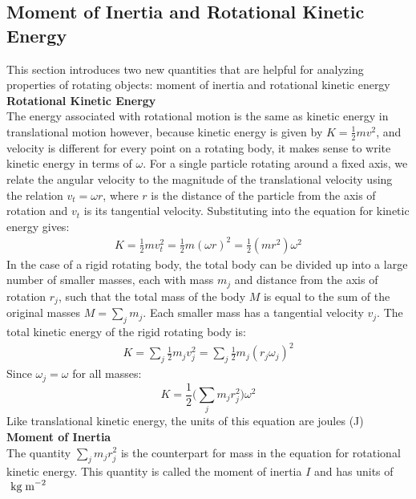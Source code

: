 \documentclass[a4paper]{article}
\let\bf\textbf
\newcommand\kgmm{\text{ kg\;m}^{-2}}
\begin{document}
\subsection{Moment of Inertia and Rotational Kinetic Energy}
This section introduces two new quantities that are helpful for analyzing properties of rotating objects: moment of inertia and rotational kinetic energy
\vspace{2mm}\\
\bf{Rotational Kinetic Energy}
\vspace{2mm}\\
The energy associated with rotational motion is the same as kinetic energy in translational motion however, because kinetic energy is given by $K = \frac{1}{2}mv^2$, and velocity is different for every point on a rotating body, it makes sense to write kinetic energy in terms of $\omega$. For a single particle rotating around a fixed axis, we relate the angular velocity to the magnitude of the translational velocity using the relation $v_t = \omega r$, where $r$ is the distance of the particle from the axis of rotation and $v_t$ is its tangential velocity. Substituting into the equation for kinetic energy gives:
\begin{align*}
    K = \frac{1}{2}mv_t^2 = \frac{1}{2}m(\omega r)^2 = \frac{1}{2}(mr^2)\omega^2
\end{align*}
In the case of a rigid rotating body, the total body can be divided up into a large number of smaller masses, each with mass $m_j$ and distance from the axis of rotation $r_j$, such that the total mass of the body $M$ is equal to the sum of the original masses $M = \sum_{j}m_j$. Each smaller mass has a tangential velocity $v_j$. The total kinetic energy of the rigid rotating body is:
\begin{align*}
    K = \sum_{j}\frac{1}{2}m_jv^2_j = \sum_{j}\frac{1}{2}m_j(r_j\omega_j)^2
\end{align*}
Since $\omega_j = \omega$ for all masses:
\begin{equation}
    K = \frac{1}{2}\bigg(\sum_{j}m_jr^2_j\bigg)\omega^2 
\end{equation}
Like translational kinetic energy, the units of this equation are joules (J)
\vspace{2mm}\\
\bf{Moment of Inertia}
\vspace{2mm}\\
The quantity $\sum\limits_j m_jr^2_j$ is the counterpart for mass in the equation for rotational kinetic energy. This quantity is called the moment of inertia $I$ and has units of$\kgmm$
\end{document}

